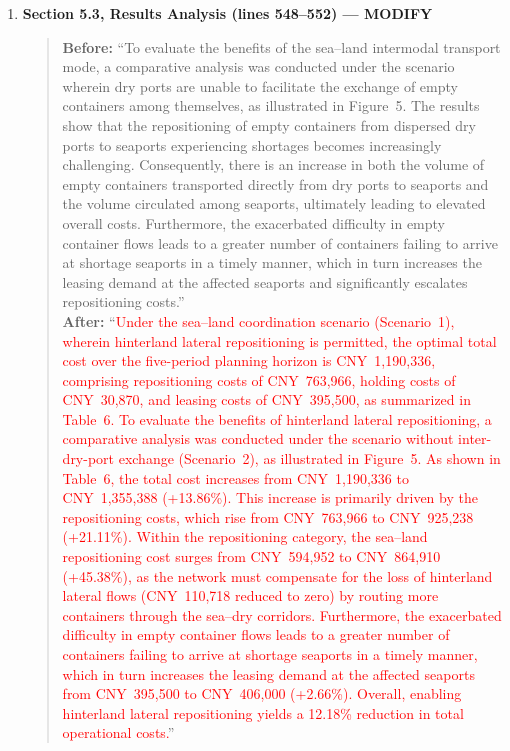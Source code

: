 \documentclass[11pt,a4paper]{article}
\begin{document}
\begin{enumerate}
\item \textbf{Section 5.3, Results Analysis (lines 548--552) --- MODIFY}
\begin{quote}
\textbf{Before:} ``To evaluate the benefits of the sea--land intermodal transport mode, a comparative analysis was conducted under the scenario wherein dry ports are unable to facilitate the exchange of empty containers among themselves, as illustrated in Figure~5. The results show that the repositioning of empty containers from dispersed dry ports to seaports experiencing shortages becomes increasingly challenging. Consequently, there is an increase in both the volume of empty containers transported directly from dry ports to seaports and the volume circulated among seaports, ultimately leading to elevated overall costs. Furthermore, the exacerbated difficulty in empty container flows leads to a greater number of containers failing to arrive at shortage seaports in a timely manner, which in turn increases the leasing demand at the affected seaports and significantly escalates repositioning costs.''\\[4pt]
\textbf{After:} ``\textcolor{red}{Under the sea--land coordination scenario (Scenario~1), wherein hinterland lateral repositioning is permitted, the optimal total cost over the five-period planning horizon is CNY~1,190,336, comprising repositioning costs of CNY~763,966, holding costs of CNY~30,870, and leasing costs of CNY~395,500, as summarized in Table~6.} \textcolor{red}{To evaluate the benefits of hinterland lateral repositioning, a comparative analysis was conducted under the scenario without inter-dry-port exchange (Scenario~2), as illustrated in Figure~5. As shown in Table~6, the total cost increases from CNY~1,190,336 to CNY~1,355,388 (+13.86\%). This increase is primarily driven by the repositioning costs, which rise from CNY~763,966 to CNY~925,238 (+21.11\%). Within the repositioning category, the sea--land repositioning cost surges from CNY~594,952 to CNY~864,910 (+45.38\%), as the network must compensate for the loss of hinterland lateral flows (CNY~110,718 reduced to zero) by routing more containers through the sea--dry corridors. Furthermore, the exacerbated difficulty in empty container flows leads to a greater number of containers failing to arrive at shortage seaports in a timely manner, which in turn increases the leasing demand at the affected seaports from CNY~395,500 to CNY~406,000 (+2.66\%). Overall, enabling hinterland lateral repositioning yields a 12.18\% reduction in total operational costs.}''
\end{quote}


\end{enumerate}
\end{document}

